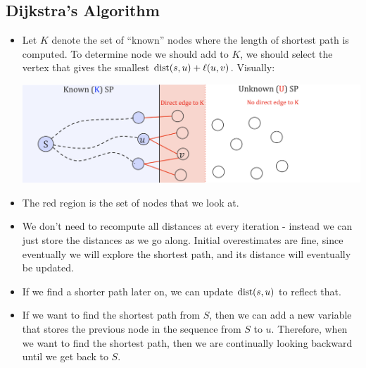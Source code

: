 	\subsection{Dijkstra's Algorithm}
	\begin{itemize}
		\item Let $K$ denote the set of ``known'' nodes where the length of shortest path is computed. To 
			determine node we should add to $K$, we should select the vertex that gives the smallest 
			$\mathrm{dist}(s, u) + \ell(u, v)$. Visually:
			\begin{center}
				\includegraphics[scale=0.5]{dijkstra.png}
			\end{center}
		\item The red region is the set of nodes that we look at.
		\item We don't need to recompute all distances at every iteration - instead we can just store 
			the distances as we go along. Initial overestimates are fine, since eventually we will explore 
			the shortest path, and its distance will eventually be updated. 
		\item If we find a shorter path later on, we can update $\mathrm{dist}(s, u)$ to reflect that.
		\item If we want to find the shortest path from $S$, then we can add a new variable that stores 
			the previous node in the sequence from $S$ to $u$. Therefore, when we want to find the 
			shortest path, then we are continually looking backward until we get back to $S$. 
	\end{itemize}

